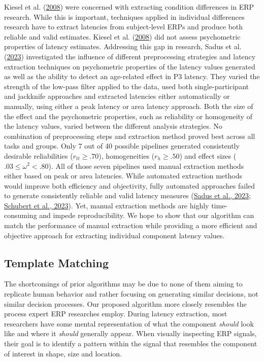 \documentclass[
  man]{apa7}
\begin{document}
Kiesel et al. (\protect\hyperlink{ref-kiesel2008measurement}{2008}) were concerned with extracting condition differences in ERP research. While this is important, techniques applied in individual differences research have to extract latencies from subject-level ERPs and produce both reliable and valid estimates. Kiesel et al. (\protect\hyperlink{ref-kiesel2008measurement}{2008}) did not assess psychometric properties of latency estimates. Addressing this gap in research, Sadus et al. (\protect\hyperlink{ref-sadus2023multiverse}{2023}) investigated the influence of different preprocessing strategies and latency extraction techniques on psychometric properties of the latency values generated as well as the ability to detect an age-related effect in P3 latency. They varied the strength of the low-pass filter applied to the data, used both single-participant and jackknife approaches and extracted latencies either automatically or manually, using either a peak latency or area latency approach. Both the size of the effect and the psychometric properties, such as reliability or homogeneity of the latency values, varied between the different analysis strategies. No combination of preprocessing steps and extraction method proved best across all tasks and groups. Only 7 out of 40 possible pipelines generated consistently desirable reliabilities (\(r_{tt} \ge .70\)), homogeneities (\(r_{h} \ge .50\)) and effect sizes (\(.03 \le \omega^2 <.80\)). All of those seven pipelines used manual extraction methods either based on peak or area latencies. While automated extraction methods would improve both efficiency and objectivity, fully automated approaches failed to generate consistently reliable and valid latency measures (\protect\hyperlink{ref-sadus2023multiverse}{Sadus et al., 2023}; \protect\hyperlink{ref-schubert2023robust}{Schubert et al., 2023}). Yet, manual extraction methods are highly time-consuming and impede reproducibility. We hope to show that our algorithm can match the performance of manual extraction while providing a more efficient and objective approach for extracting individual component latency values.

\hypertarget{template-matching}{%
\subsection{Template Matching}\label{template-matching}}

The shortcomings of prior algorithms may be due to none of them aiming to replicate human behavior and rather focusing on generating similar decisions, not similar decision processes. Our proposed algorithm more closely resembles the process expert ERP researches employ. During latency extraction, most researchers have some mental representation of what the component \emph{should} look like and where it \emph{should} generally appear. When visually inspecting ERP signals, their goal is to identify a pattern within the signal that resembles the component of interest in shape, size and location.
\end{document}
